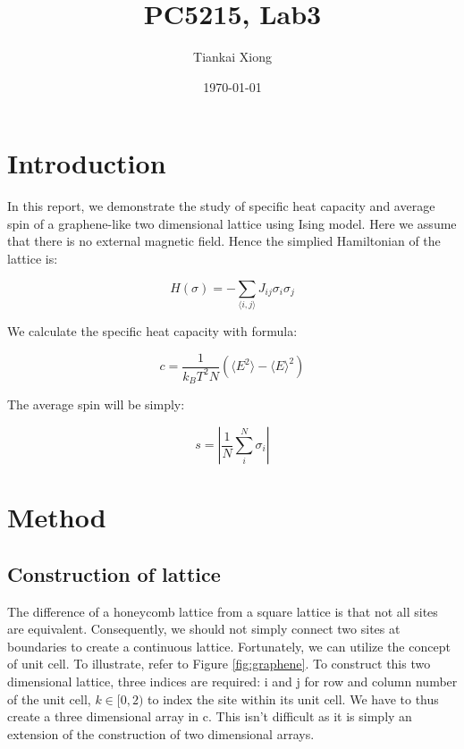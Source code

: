 \documentclass{article}
\author{Tiankai Xiong}
\date{\today}
\title{PC5215, Lab3}
\begin{document}
\maketitle

\section{Introduction}
\label{sec-1}

In this report, we demonstrate the study of specific heat capacity
and average spin of a graphene-like two dimensional lattice using
Ising model. Here we assume that there is no external magnetic
field. Hence the simplied Hamiltonian of the lattice is:

$$H(\sigma) = - \sum_{\langle i, j\rangle}J_{ij} \sigma_i \sigma_j$$

We calculate the specific heat capacity with formula:

$$c = \frac{1}{k_B T^2 N}(\langle E^2 \rangle - \langle E \rangle ^2)$$

The average spin will be simply:

$$s = |\frac{1}{N} \sum_i^N \sigma_i|$$

\section{Method}
\label{sec-2}

\subsection{Construction of lattice}
\label{sec-2-1}

The difference of a honeycomb lattice from a square lattice is that
not all sites are equivalent. Consequently, we should not simply
connect two sites at boundaries to create a continuous
lattice. Fortunately, we can utilize the concept of unit cell. To
illustrate, refer to Figure \ref{fig:graphene}. To construct
this two dimensional lattice, three indices are required: i and j
for row and column number of the unit cell, $k\in [0, 2)$ to index
the site within its unit cell. We have to thus create a three
dimensional array in c. This isn't difficult as it is simply an
extension of the construction of two dimensional arrays.
\end{document}
